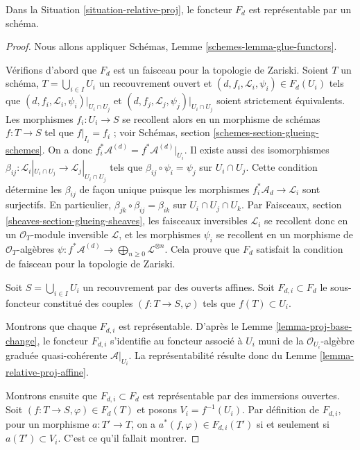 \begin{lemma}
\label{lemma-relative-proj-d}
Dans la Situation \ref{situation-relative-proj}, le foncteur $F_d$ est
représentable par un schéma.
\end{lemma}

\begin{proof}
Nous allons appliquer Schémas, Lemme \ref{schemes-lemma-glue-functors}.

\medskip\noindent
Vérifions d'abord que $F_d$ est un faisceau pour la topologie de Zariski.
Soient $T$ un schéma, $T = \bigcup_{i \in I} U_i$
un recouvrement ouvert et
$(d, f_i, \mathcal{L}_i, \psi_i) \in F_d(U_i)$ tels que
$(d, f_i, \mathcal{L}_i, \psi_i)|_{U_i \cap U_j}$ et
$(d, f_j, \mathcal{L}_j, \psi_j)|_{U_i \cap U_j}$ soient strictement
équivalents. Les morphismes $f_i : U_i \to S$ se recollent alors en un
morphisme de schémas $f : T \to S$ tel que $f|_{I_i} = f_i$ ; voir
Schémas, section \ref{schemes-section-glueing-schemes}.
On a donc $f_i^*\mathcal{A}^{(d)} = f^*\mathcal{A}^{(d)}|_{U_i}$.
Il existe aussi des isomorphismes
$\beta_{ij} : \mathcal{L}_i|_{U_i \cap U_j} \to \mathcal{L}_j|_{U_i \cap U_j}$
tels que $\beta_{ij} \circ \psi_i = \psi_j$ sur $U_i \cap U_j$.
Cette condition détermine les $\beta_{ij}$ de façon unique puisque les
morphismes $f_i^*\mathcal{A}_d \to \mathcal{L}_i$ sont surjectifs.
En particulier, $\beta_{jk} \circ \beta_{ij} = \beta_{ik}$ sur
$U_i \cap U_j \cap U_k$. Par Faisceaux,
section \ref{sheaves-section-glueing-sheaves}, les faisceaux inversibles
$\mathcal{L}_i$ se recollent donc en un $\mathcal{O}_T$-module inversible
$\mathcal{L}$, et les morphismes $\psi_i$ se recollent en un morphisme de
$\mathcal{O}_T$-algèbres
$\psi : f^*\mathcal{A}^{(d)} \to \bigoplus_{n \geq 0} \mathcal{L}^{\otimes n}$.
Cela prouve que $F_d$ satisfait la
condition de faisceau pour la topologie
de Zariski.

\medskip\noindent
Soit $S = \bigcup_{i \in I} U_i$ un
recouvrement par des ouverts affines.
Soit $F_{d, i} \subset F_d$ le sous-foncteur constitué des couples
$(f : T \to S, \varphi)$ tels que $f(T) \subset U_i$.

\medskip\noindent
Montrons que chaque $F_{d, i}$ est représentable. D'après le
Lemme \ref{lemma-proj-base-change}, le
foncteur $F_{d, i}$ s'identifie au foncteur
associé à $U_i$ muni de la $\mathcal{O}_{U_i}$-algèbre graduée
quasi-cohérente $\mathcal{A}|_{U_i}$. La représentabilité résulte donc du
Lemme \ref{lemma-relative-proj-affine}.

\medskip\noindent
Montrons ensuite que $F_{d, i} \subset F_d$ est représentable par des
immersions ouvertes. Soit $(f : T \to S, \varphi) \in F_d(T)$ et posons
$V_i = f^{-1}(U_i)$. Par définition de $F_{d, i}$, pour un morphisme
$a : T' \to T$, on a $a^*(f, \varphi) \in F_{d, i}(T')$ si et seulement si
$a(T') \subset V_i$. C'est ce qu'il fallait montrer.


\end{proof}
